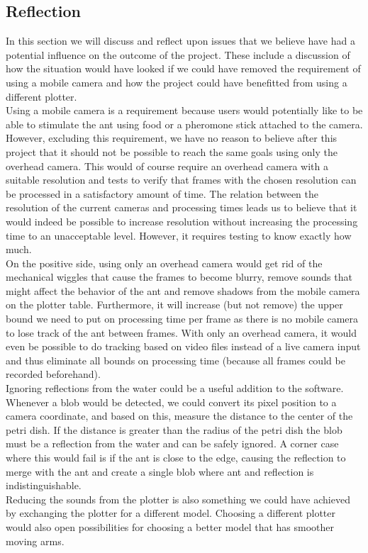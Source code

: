 
\subsection{Reflection}
In this section we will discuss and reflect upon issues that we believe have had a potential influence on the outcome of the project. These include a discussion of how the situation would have looked if we could have removed the requirement of using a mobile camera and how the project could have benefitted from using a different plotter. \\

Using a mobile camera is a requirement because users would potentially like to be able to stimulate the ant using food or a pheromone stick attached to the camera. However, excluding this requirement, we have no reason to believe after this project that it should not be possible to reach the same goals using only the overhead camera. This would of course require an overhead camera with a suitable resolution and tests to verify that frames with the chosen resolution can be processed in a satisfactory amount of time. The relation between the resolution of the current cameras and processing times leads us to believe that it would indeed be possible to increase resolution without increasing the processing time to an unacceptable level. However, it requires testing to know exactly how much. \\

On the positive side, using only an overhead camera would get rid of the mechanical wiggles that cause the frames to become blurry, remove sounds that might affect the behavior of the ant and remove shadows from the mobile camera on the plotter table. Furthermore, it will increase (but not remove) the upper bound we need to put on processing time per frame as there is no mobile camera to lose track of the ant between frames. With only an overhead camera, it would even be possible to do tracking based on   video files instead of a live camera input and thus eliminate all bounds on processing time (because all frames could be recorded beforehand). \\

Ignoring reflections from the water could be a useful addition to the software. Whenever a blob would be detected, we could convert its pixel position to a camera coordinate, and based on this, measure the distance to the center of the petri dish. If the distance is greater than the radius of the petri dish the blob must be a reflection from the water and can be safely ignored. A corner case where this would fail is if the ant is close to the edge, causing the reflection to merge with the ant and create a single blob where ant and reflection is indistinguishable.\\

Reducing the sounds from the plotter is also something we could have achieved by exchanging the plotter for a different model. Choosing a different plotter would also open possibilities for choosing a better model that has smoother moving arms.